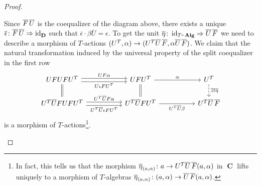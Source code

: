 \documentclass[a4paper,11pt,fullpage,oneside,openany]{amsbook}
\DeclareMathOperator{\Alg}{\mathbf{Alg}}
\DeclareMathOperator{\C}{\mathbf{C}}
\DeclareMathOperator{\D}{\mathbf{D}}
\DeclareMathOperator{\id}{id}
\theoremstyle{definition}
\theoremstyle{definition}
\theoremstyle{remark}
\begin{document}
\begin{proof}
\begin{enumerate}
	Since $\overline{F}\hspace{.5mm}\overline{U}$ is the coequalizer of the diagram above, there exists a unique $\overline{\epsilon}\colon\overline{F}\hspace{.5mm}\overline{U}\Rightarrow\id_{\D}$ such that $\overline{\epsilon}\cdot\beta\overline{U}=\epsilon$. To get the unit $\overline{\eta}\colon\id_{T\mbox{-}\Alg}\Rightarrow\overline{U}\hspace{.5mm}\overline{F}$ we need to describe a morphism of $T$-actions $(U^T,\alpha)\to(U^T\overline{U}\hspace{.5mm}\overline{F},\alpha\overline{U}\hspace{.5mm}\overline{F})$. We claim that the natural transformation induced by the universal property of the split coequalizer in the first row
	\[
	\begin{tikzcd}[column sep=1.8cm]
	UFUFU^T\arrow[r, shift left, "UF\alpha"] \arrow[r, shift right, "U\epsilon FU^T"']\arrow[d, equal]	& UFU^T\arrow[r, "\alpha"] \arrow[d, equal] & U^T \arrow[d, dashed, "\exists!\overline{\eta}"]\\
	U^T\overline{U}FUFU^T\arrow[r, shift left,  "U^T\overline{U}F\alpha"] \arrow[r, shift right, "U^T\overline{U}\epsilon FU^T"']&U^T\overline{U}FU^T\arrow[r, "U^T\overline{U}\beta"']& U^T\overline{U}\hspace{.5mm}\overline{F}
	\end{tikzcd}
	\]
	is a morphism of $T$-actions\footnote{In fact, this tells us that the morphism $\overline{\eta}_{(a,\alpha)}\colon a\to U^T\overline{U}\hspace{.5mm}\overline{F}(a,\alpha)$ in $\C$ lifts uniquely to a morphism of $T$-algebras $\overline{\eta}_{(a,\alpha)}\colon(a,\alpha)\to\overline{U}\hspace{.5mm}\overline{F}(a,\alpha)$.}. 
	

\end{enumerate}
\end{proof}
\end{document}
